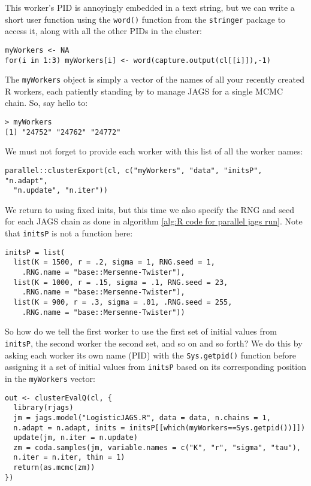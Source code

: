\documentclass[12pt,english]{article}
\begin{document}
\noindent This worker's PID is annoyingly embedded in a text string, but we can write a short user function using the \texttt{word()} function from the \texttt{stringer} package to access it, along with all the other PIDs in the cluster:

\begin{Verbatim}
myWorkers <- NA
for(i in 1:3) myWorkers[i] <- word(capture.output(cl[[i]]),-1)
\end{Verbatim}

\noindent The \texttt{myWorkers} object is simply a vector of the names of all your recently created R workers, each patiently standing by to manage JAGS for a single MCMC chain. So, say hello to:

\begin{Verbatim}[fontsize=\small]
> myWorkers
[1] "24752" "24762" "24772"
\end{Verbatim}

\noindent We must not forget to provide each worker with this list of all the worker names:

\begin{Verbatim}
parallel::clusterExport(cl, c("myWorkers", "data", "initsP", "n.adapt", 
  "n.update", "n.iter"))
\end{Verbatim}

We return to using fixed inits, but this time we also specify the RNG and seed for each JAGS chain as done in algorithm \ref{alg:R code for parallel jags run}. Note that \texttt{initsP} is not a function here:

\begin{Verbatim}
initsP = list(
  list(K = 1500, r = .2, sigma = 1, RNG.seed = 1,
    .RNG.name = "base::Mersenne-Twister"),
  list(K = 1000, r = .15, sigma = .1, RNG.seed = 23,
    .RNG.name = "base::Mersenne-Twister"),
  list(K = 900, r = .3, sigma = .01, .RNG.seed = 255,
    .RNG.name = "base::Mersenne-Twister"))
\end{Verbatim}

So how do we tell the first worker to use the first set of initial values from \texttt{initsP}, the second worker the second set, and so on and so forth? We do this by asking each worker its own name (PID) with the \texttt{Sys.getpid()} function before assigning it a set of initial values from \texttt{initsP} based on its corresponding position in the \texttt{myWorkers} vector:

\begin{Verbatim}
out <- clusterEvalQ(cl, {
  library(rjags)
  jm = jags.model("LogisticJAGS.R", data = data, n.chains = 1, 
  n.adapt = n.adapt, inits = initsP[[which(myWorkers==Sys.getpid())]])
  update(jm, n.iter = n.update)
  zm = coda.samples(jm, variable.names = c("K", "r", "sigma", "tau"), 
  n.iter = n.iter, thin = 1)
  return(as.mcmc(zm))
}) 
\end{Verbatim} 
 
\end{document}
